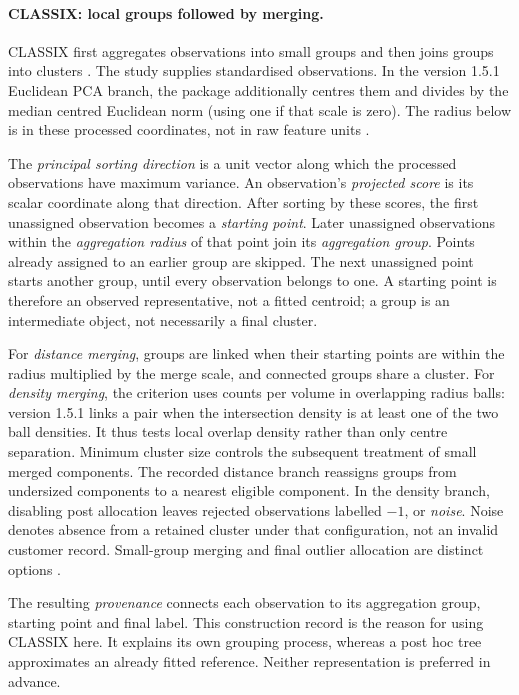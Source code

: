 \paragraph{CLASSIX: local groups followed by merging.}
CLASSIX first aggregates observations into small groups and then joins groups into clusters \citep{chen2024classix}. The study supplies standardised observations. In the version 1.5.1 Euclidean PCA branch, the package additionally centres them and divides by the median centred Euclidean norm (using one if that scale is zero). The radius below is in these processed coordinates, not in raw feature units \citep{classix151}.

The \emph{principal sorting direction} is a unit vector along which the processed observations have maximum variance. An observation's \emph{projected score} is its scalar coordinate along that direction. After sorting by these scores, the first unassigned observation becomes a \emph{starting point}. Later unassigned observations within the \emph{aggregation radius} of that point join its \emph{aggregation group}. Points already assigned to an earlier group are skipped. The next unassigned point starts another group, until every observation belongs to one. A starting point is therefore an observed representative, not a fitted centroid; a group is an intermediate object, not necessarily a final cluster.

For \emph{distance merging}, groups are linked when their starting points are within the radius multiplied by the merge scale, and connected groups share a cluster. For \emph{density merging}, the criterion uses counts per volume in overlapping radius balls: version 1.5.1 links a pair when the intersection density is at least one of the two ball densities. It thus tests local overlap density rather than only centre separation. Minimum cluster size controls the subsequent treatment of small merged components. The recorded distance branch reassigns groups from undersized components to a nearest eligible component. In the density branch, disabling post allocation leaves rejected observations labelled $-1$, or \emph{noise}. Noise denotes absence from a retained cluster under that configuration, not an invalid customer record. Small-group merging and final outlier allocation are distinct options \citep{classix151}.

The resulting \emph{provenance} connects each observation to its aggregation group, starting point and final label. This construction record is the reason for using CLASSIX here. It explains its own grouping process, whereas a post hoc tree approximates an already fitted reference. Neither representation is preferred in advance.

